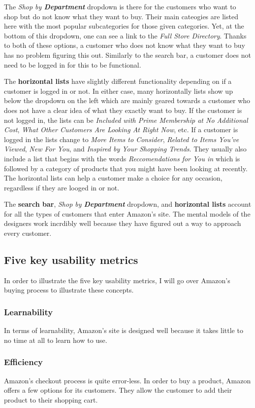 \documentclass[11pt, oneside]{article}
\begin{document}
The \textit{Shop by \textbf{Department}} dropdown is there for the customers who want to shop but do not know what they want to buy. Their main cateogies are listed here with the most popular subcategories for those given categories. Yet, at the bottom of this dropdown, one can see a link to the \textit{Full Store Directory}. Thanks to both of these options, a customer who does not know what they want to buy has no problem figuring this out. Similarly to the search bar, a customer does not need to be logged in for this to be functional.

The \textbf{horizontal lists} have slightly different functionality depending on if a customer is logged in or not. In either case, many horizontally lists show up below the dropdown on the left which are mainly geared towards a customer who does not have a clear idea of what they exactly want to buy. If the customer is not logged in, the lists can be \textit{Included with Prime Membership at No Additional Cost}, \textit{What Other Customers Are Looking At Right Now}, etc. If a customer is logged in the lists change to \textit{More Items to Consider}, \textit{Related to Items You've Viewed}, \textit{New For You}, and \textit{Inspired by Your Shopping Trends}. They usually also include a list that begins with the words \textit{Reccomendations for You in} which is followed by a category of products that you might have been looking at recently. The horizontal lists can help a customer make a choice for any occasion, regardless if they are looged in or not.

The \textbf{search bar}, \textit{Shop by \textbf{Department}} dropdown, and \textbf{horizontal lists} account for all the types of customers that enter Amazon's site. The mental models of the designers work incrdibly well because they have figured out a way to approach every customer.

\subsection{Five key usability metrics}
In order to illustrate the five key usability metrics, I will go over Amazon's buying process to illustrate these concepts.
\subsubsection{Learnability}
In terms of learnability, Amazon's site is designed well because it takes little to no time at all to learn how to use.

\subsubsection{Efficiency}
Amazon's checkout process is quite error-less. In order to buy a product, Amazon offers a few options for its customers. 
They allow the customer to add their product to their shopping cart.
\end{document}
